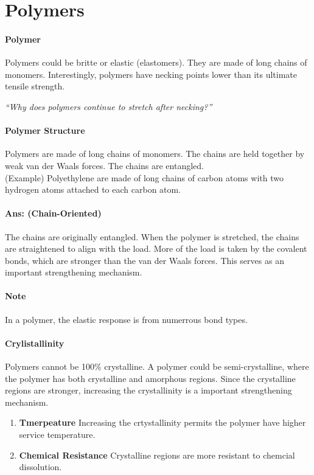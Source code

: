 \documentclass[11pt]{article}
\begin{document}
\section{Polymers} 
\paragraph{Polymer} Polymers could be britte or elastic (elastomers). They are made of long chains of monomers. Interestingly, polymers have necking points lower than its ultimate tensile strength.
\begin{center}
    \textit{``Why does polymers continue to stretch after necking?''}
\end{center}
\paragraph{Polymer Structure} Polymers are made of long chains of monomers. The chains are held together by weak van der Waals forces. The chains are entangled.
\\ (Example) Polyethylene are made of long chains of carbon atoms with two hydrogen atoms attached to each carbon atom.
\paragraph{Ans: (Chain-Oriented)} The chains are originally entangled. When the polymer is stretched, the chains are straightened to align with the load. More of the load is taken by the covalent bonds, which are stronger than the van der Waals forces. This serves as an important strengthening mechanism.
\paragraph{Note} In a polymer, the elastic response is from numerrous bond types.
\paragraph{Crylistallinity} Polymers cannot be 100\% crystalline. A polymer could be semi-crystalline, where the polymer has both crystalline and amorphous regions. Since the crystalline regions are stronger, increasing the crystallinity is a important strengthening mechanism.
\begin{enumerate}
    \item \textbf{Tmerpeature} Increasing the crtystallinity permits the polymer have higher service temperature. 
    \item \textbf{Chemical Resistance} Crystalline regions are more resistant to chemcial dissolution.
\end{enumerate}
\end{document}

